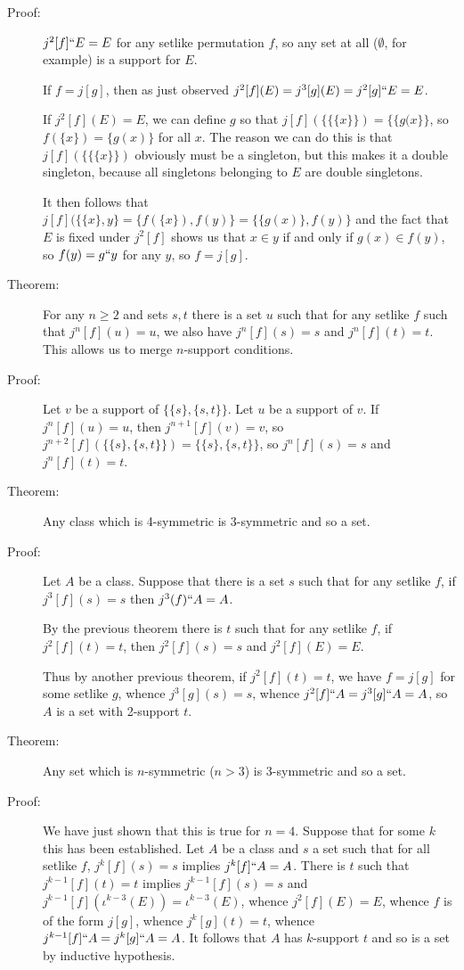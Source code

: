 \documentclass[12pt]{article}
\begin{document}
\begin{description}
\item[Proof:]   $j^2[f]``E = E$ for any setlike permutation $f$, so any set at all ($\emptyset$, for example) is a support for $E$.

If $f=j[g]$, then as just observed $j^2[f](E) = j^3[g](E)= j^2[g]``E = E$.

If $j^2[f](E)=E$, we can define $g$ so that $j[f](\{\{\{x\}\}) = \{\{g(x\}\}$, so $f(\{x\}) = \{g(x)\}$ for all $x$.  The reason we can do this is that $j[f](\{\{\{x\}\})$ obviously must be a singleton,
but this makes it a double singleton, because all singletons belonging to $E$ are double singletons.

It then follows that  $j[f](\{\{x\},y\} = \{f(\{x\}),f(y)\} = \{\{g(x)\},f(y)\}$ and the fact that $E$ is fixed under
$j^2[f]$ shows us that $x \in y$ if and only if $g(x) \in f(y)$, so $f(y) = g``y$ for any $y$, so $f=j[g]$.

\item[Theorem:]  For any $n \geq 2$ and sets $s,t$ there is a set $u$ such that for any setlike $f$ such that $j^n[f](u) = u$, we also have
$j^n[f](s)=s$ and $j^n[f](t)=t$.  This allows us to merge $n$-support conditions.

\item[Proof:]  Let $v$ be a support of $\{\{s\},\{s,t\}\}$.  Let $u$ be a support of $v$.  If $j^n[f](u) = u$, then $j^{n+1}[f](v)=v$,
so $j^{n+2}[f](\{\{s\},\{s,t\}\})= \{\{s\},\{s,t\}\}$, so $j^n[f](s)=s$ and $j^n[f](t)=t$.

\item[Theorem:]  Any  class which is 4-symmetric is 3-symmetric and so a set.

\item[Proof:]  Let $A$ be a class.  Suppose that there is a set $s$ such that for any setlike $f$, if $j^3[f](s)=s$ then $j^3(f)``A=A$.

By the previous theorem there is $t$ such that for any setlike $f$, if $j^2[f](t)=t$, then $j^2[f](s)=s$ and $j^2[f](E)=E$.

Thus by another previous theorem, if $j^2[f](t)=t$, we have $f=j[g]$ for some setlike $g$, whence $j^3[g](s)=s$, whence
$j^2[f]``A = j^3[g]``A = A$, so $A$ is a set with 2-support $t$.

\item[Theorem:]  Any set which is $n$-symmetric ($n>3$) is  3-symmetric and so a set.

\item[Proof:]  We have just shown that this is true for $n=4$.  Suppose that for some $k$ this has been established.
Let $A$ be a class and $s$ a set such that for all setlike $f$, $j^{k}[f](s)=s$ implies $j^{k}[f]``A=A$.
There is $t$ such that $j^{k-1}[f](t)=t$ implies $j^{k-1}[f](s)=s$ and $j^{k-1}[f](\iota^{k-3}(E))=\iota^{k-3}(E)$, whence
$j^2[f](E)=E$, whence $f$ is of the form $j[g]$, whence $j^{k}[g](t)=t$, whence $j^{k-1}[f]``A = j^{k}[g]``A=A$.
It follows that $A$ has $k$-support $t$ and so is a set by inductive hypothesis.


\end{description}
\end{document}
